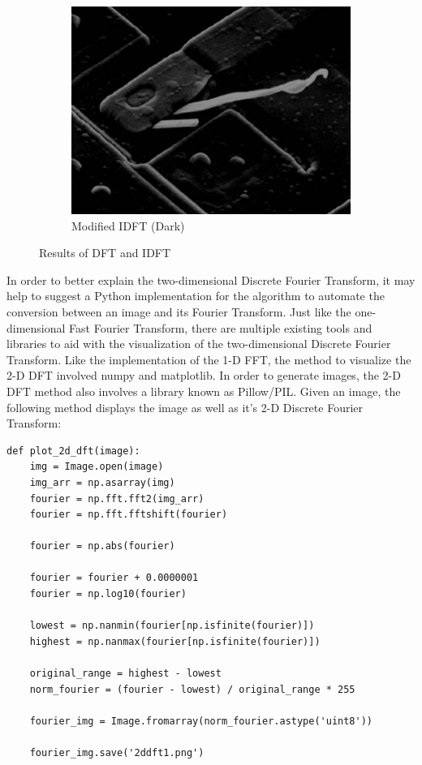 \documentclass{amsproc}
\begin{document}
\begin{figure}[h]
\begin{subfigure}{.3\textwidth}
	\includegraphics[scale=.25]{images/dftimage3.png}
	\caption{Modified IDFT (Dark)}
	\label{fig:sub10}
\end{subfigure}
\caption{Results of DFT and IDFT}
\label{fig:im2}
\end{figure}

In order to better explain the two-dimensional Discrete Fourier Transform, it may help to suggest a Python implementation for the algorithm to automate the conversion between an image and its Fourier Transform. Just like the one-dimensional Fast Fourier Transform, there are multiple existing tools and libraries to aid with the visualization of the two-dimensional Discrete Fourier Transform. Like the implementation of the 1-D FFT, the method to visualize the 2-D DFT involved numpy and matplotlib. In order to generate images, the 2-D DFT method also involves a library known as Pillow/PIL. Given an image, the following method displays the image as well as it's 2-D Discrete Fourier Transform:

\begin{Verbatim}[tabsize=4]
def plot_2d_dft(image):
	img = Image.open(image)
	img_arr = np.asarray(img)
	fourier = np.fft.fft2(img_arr)
	fourier = np.fft.fftshift(fourier)

	fourier = np.abs(fourier)

	fourier = fourier + 0.0000001
	fourier = np.log10(fourier)

	lowest = np.nanmin(fourier[np.isfinite(fourier)])
	highest = np.nanmax(fourier[np.isfinite(fourier)])

	original_range = highest - lowest
	norm_fourier = (fourier - lowest) / original_range * 255

	fourier_img = Image.fromarray(norm_fourier.astype('uint8'))

	fourier_img.save('2ddft1.png')
\end{Verbatim}
\end{document}
